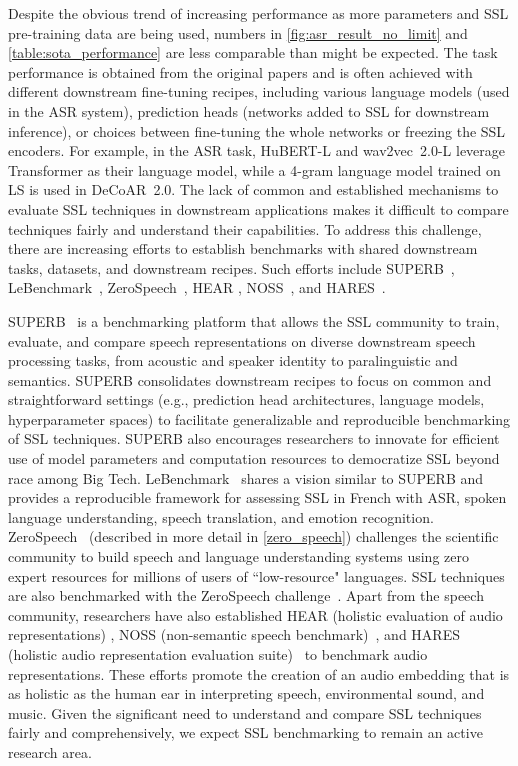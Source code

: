 Despite the obvious trend of increasing performance as more parameters and SSL
pre-training data are being used, numbers in \cref{fig:asr_result_no_limit} 
and \cref{table:sota_performance} are less comparable than might be expected.
The task performance is obtained from the original papers and is often
achieved with different downstream fine-tuning recipes, including various
language models (used in the ASR system), prediction heads (networks added to
SSL for downstream inference), or choices between fine-tuning the whole
networks or freezing the SSL encoders. For example, in the ASR task, HuBERT-L
and wav2vec~2.0-L leverage Transformer as their language model, while a 4-gram
language model trained on LS is used in DeCoAR~2.0. The lack of common and
established mechanisms to evaluate SSL techniques in downstream applications
makes it difficult to compare techniques fairly and understand their
capabilities. To address this challenge, there are increasing efforts to establish
benchmarks with shared downstream tasks, datasets, and downstream recipes. Such
efforts include SUPERB~\parencite{yang_superb_2021}, 
LeBenchmark~\parencite{evain_lebenchmark_2021}, ZeroSpeech~\parencite{dunbar_zero_2020},
HEAR \parencite{turian_hear_2022},
NOSS~\parencite{shor_learning_2020}, and HARES~\parencite{wang_learning_2021}. 

SUPERB~\parencite{yang_superb_2021} is a benchmarking platform that allows the
SSL community to train, evaluate, and compare speech representations on
diverse downstream speech processing tasks, from acoustic and speaker identity
to paralinguistic and semantics. SUPERB consolidates downstream recipes to
focus on common and straightforward settings (e.g., prediction head
architectures, language models, hyperparameter spaces) to facilitate generalizable
and reproducible benchmarking of SSL techniques. SUPERB also encourages
researchers to innovate for efficient use of model parameters and computation
resources 
to democratize SSL beyond race among Big Tech.   %
LeBenchmark~\parencite{evain_lebenchmark_2021} shares a vision similar to SUPERB and provides a
reproducible framework for assessing SSL in French with ASR, spoken language
understanding, speech translation, and emotion recognition. 
ZeroSpeech~\parencite{dunbar_zero_2020} (described in more detail in \cref{zero_speech})
challenges the scientific community to build speech and language understanding
systems using zero expert resources 
for millions of users of ``low-resource" languages.
SSL techniques are also benchmarked with the ZeroSpeech 
challenge~\parencite{tjandra_transformer_2020, vanniekerk_vectorquantized_2020}. Apart from the speech
community, researchers have also established HEAR (holistic evaluation of audio
representations) \parencite{turian_hear_2022}, NOSS (non-semantic
speech benchmark)~\parencite{shor_learning_2020}, and HARES (holistic audio
representation evaluation suite)~\parencite{wang_learning_2021} to benchmark audio
representations. These efforts promote the creation of an audio embedding
that is as holistic as the human ear in interpreting speech, environmental
sound, and music. Given the significant need to understand and compare SSL techniques
fairly and comprehensively, we expect SSL benchmarking to remain an
active research area.

